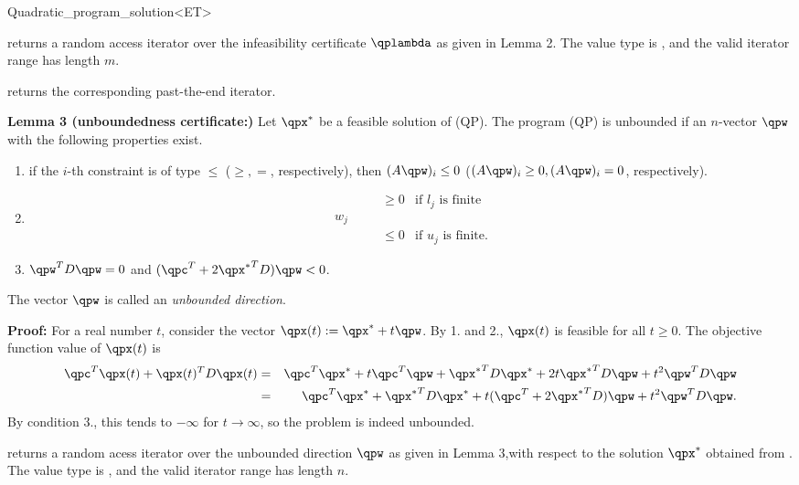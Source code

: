 \begin{ccRefClass}{Quadratic_program_solution<ET>}
\begin{ccAdvanced}
{returns a random access iterator over the infeasibility certificate 
$\qplambda$ as given in Lemma 2. The value type
is , and the valid iterator range has length $m$.
}

{returns the corresponding past-the-end iterator.}

\ccExample
{}

{\bf Lemma 3 (unboundedness certificate:)} Let $\qpx^*$ be a feasible
solution of (QP). The program (QP) is unbounded if an $n$-vector 
$\qpw$ with the following properties exist.
\begin{enumerate}
\item if the $i$-th constraint is of type $\leq$ ($\geq, =$, respectively),
then $(A\qpw)_i\leq 0$ ($(A\qpw)_i\geq 0, (A\qpw)_i=0$, respectively).
\item 
\[
\begin{array}{llll}
&&\geq 0 & \mbox{if $l_j$ is finite} \\
w_j &\quad  \\
&&\leq 0 & \mbox{if $u_j$ is finite.}
\end{array}
\]
\item $\qpw^TD\qpw=0$ and $(\qpc^T+2{\qpx^*}^TD)\qpw<0$.
\end{enumerate}

The vector $\qpw$ is called an \emph{unbounded direction}.

{\bf Proof:} For a real number $t$, consider the vector $\qpx(t):=\qpx^*+t\qpw$. By 1.
and 2., $\qpx(t)$ is feasible for all $t\geq 0$. The objective function value
of $\qpx(t)$ is
\begin{eqnarray*}
\qpc^T \qpx(t) + \qpx(t)^TD \qpx(t) &=& 
\qpc^T\qpx^* + t\qpc^T\qpw + {\qpx^*}^TD\qpx^* +  2t{\qpx^*}^TD\qpw + t^2 \qpw^TD\qpw  \\
&=& \qpc^T\qpx^* + {\qpx^*}^TD\qpx^* + t(\qpc^T + 2{\qpx^*}^TD)\qpw + t^2\qpw^TD\qpw.
\end{eqnarray*}
By condition 3., this tends to $-\infty$ for $t\rightarrow\infty$, so
the problem is indeed unbounded. 

{returns a random acess iterator over the unbounded direction $\qpw$
as given in Lemma 3,with respect to the solution $\qpx^*$ 
obtained from \ccVar{}. The value type
is , and the valid iterator range has length $n$.
}


\end{ccAdvanced}
\end{ccRefClass}
